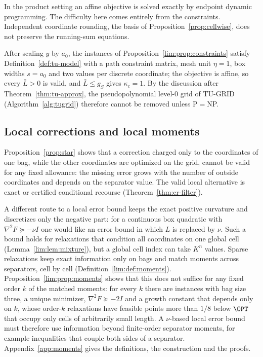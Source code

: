 In the product setting an affine objective is solved exactly by endpoint
dynamic programming. The difficulty here comes entirely from the
constraints. Independent coordinate rounding, the basis of
Proposition~\ref{prop:cellwise}, does not preserve the running-sum equations.

After scaling $y$ by $a_0$, the instances of
Proposition~\ref{lim:prop:constraints} satisfy Definition~\ref{def:tu-model}
with a path constraint matrix, mesh unit $\eta=1$, box widths $s=a_0$ and two
values per discrete coordinate; the objective is affine, so every $\bar L>0$
is valid, and $\bar L\le g_S$ gives $\kappa_c=1$. By the discussion after
Theorem~\ref{thm:tu-approx}, the pseudopolynomial level-$0$ grid of
TU-GRID (Algorithm~\ref{alg:tugrid}) therefore cannot be removed unless
P${}={}$NP.

\subsection{Local corrections and local moments}\label{sec:limits-local}

Proposition~\ref{prop:star} shows that a correction charged only to the
coordinates of one bag, while the other coordinates are optimized on the
grid, cannot be valid for any fixed allowance: the missing error grows with
the number of outside coordinates and depends on the separator value. The
valid local alternative is exact or certified conditional recourse
(Theorem~\ref{thm:cr-filter}).

A different route to a local error bound keeps the exact positive curvature
and discretizes only the negative part: for a continuous box quadratic with
$\nabla^2F\succeq-\nu I$ one would like an error bound in which $L$ is
replaced by $\nu$. Such a bound holds for relaxations that condition all
coordinates on one global cell (Lemma~\ref{lim:lem:mixture}), but a global
cell index can take $K^n$ values. Sparse relaxations keep exact information
only on bags and match moments across separators, cell by cell
(Definition~\ref{lim:def:moments}). Proposition~\ref{lim:prop:moments} shows
that this does not suffice for any fixed order $k$ of the matched moments: for
every $k$ there are instances with bag size three, a unique minimizer,
$\nabla^2F\succeq-2I$ and a growth constant that depends only on $k$, whose
order-$k$ relaxations have feasible points more than $1/8$ below $\OPT$ that
occupy only cells of arbitrarily small length. A $\nu$-based local error
bound must therefore use information beyond finite-order separator moments,
for example inequalities that couple both sides of a separator.
Appendix~\ref{app:moments} gives the definitions, the construction and the
proofs.

